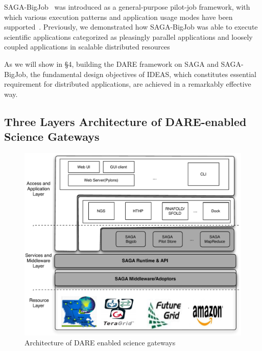 \documentclass{sig-alternate}
\begin{document}
SAGA-BigJob~\cite{saga-ccgrid10} was introduced as a general-purpose
pilot-job framework, with which various execution patterns and
application usage modes have been
supported~\cite{async_repex11,saga-royalsoc}.  Previously, we
demonstrated how SAGA-BigJob was able to execute scientific
applications categorized as pleasingly parallel applications and
loosely coupled applications in scalable distributed
resources\cite{jha2009developing, ecmls10, ecmls11}

As we will show in \S4, building the DARE framework on SAGA and
SAGA-BigJob, the fundamental design objectives of IDEAS, which
constitutes essential requirement for distributed applications, are
achieved in a remarkably effective way.

\subsection{Three Layers Architecture of DARE-enabled Science
  Gateways}


\begin{figure}
  \centering
  \includegraphics[scale=0.40]{figures/DAREOutline.pdf}
\caption{\small Architecture of DARE enabled science gateways }
  \label{fig:dare-arch} 
\end{figure}
\end{document}

